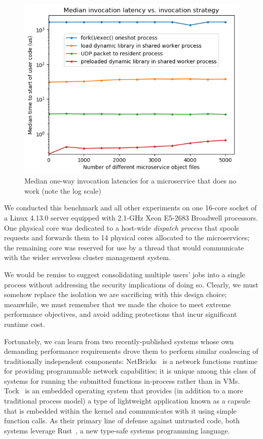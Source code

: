 \begin{figure}
\includegraphics[width=\columnwidth]{figs/2018-02-02-motivation_numfuns-latency-reordered}
\caption{Median one-way invocation latencies for a microservice that does no work (note the log scale)}
\label{fig:motive}
\end{figure}

We conducted this benchmark and all other experiments on one 16-core socket of a
Linux 4.13.0 server equipped with 2.1-GHz Xeon E5-2683 Broadwell processors.  One
physical core was dedicated to a host-wide \textit{dispatch process} that spools
requests and forwards them to 14 physical cores allocated to the microservices; the
remaining core was reserved for use by a thread that would communicate with the wider
serverless cluster management system.

We would be remiss to suggest consolidating multiple users' jobs into a single
process without addressing the security implications of doing so.  Clearly, we must
somehow replace the isolation we are sacrificing with this design choice; meanwhile,
we must remember that we made the choice to meet extreme performance objectives, and
avoid adding protections that incur significant runtime cost.

Fortunately, we can learn from two recently-published systems whose own demanding
performance requirements drove them to perform similar coalescing of traditionally
independent components:  NetBricks~\cite{Panda2016} is a network functions runtime
for providing programmable network capabilities; it is unique among this class of
systems for running the submitted functions in-process rather than in VMs.
Tock~\cite{Levy2017} is an embedded operating system that provides (in addition to a
more traditional process model) a type of lightweight application known as a capsule
that is embedded within the kernel and communicates with it using simple function
calls.  As their primary line of defense against untrusted code, both systems
leverage Rust~\cite{www-rustlang}, a new type-safe systems programming language.

